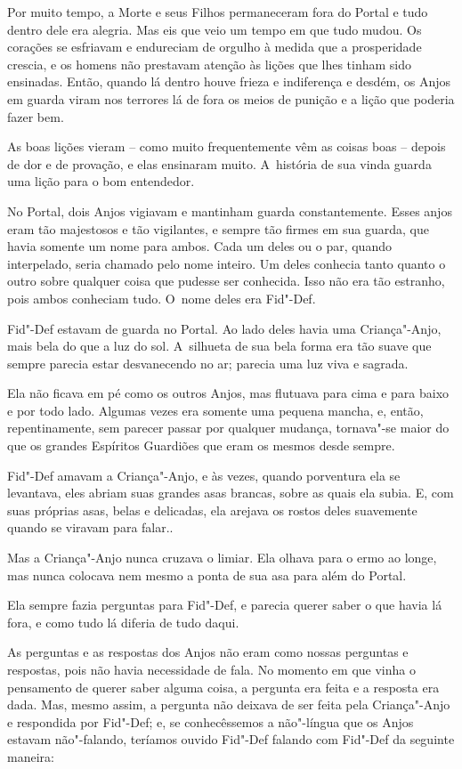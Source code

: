 Por muito tempo, a Morte e seus Filhos permaneceram fora do Portal e
tudo dentro dele era alegria. Mas eis que veio um tempo em que tudo
mudou. Os corações se esfriavam e endureciam de orgulho à medida que a
prosperidade crescia, e os homens não prestavam atenção às lições que
lhes tinham sido ensinadas. Então, quando lá dentro houve frieza e
indiferença e desdém, os Anjos em guarda viram nos terrores lá de fora
os meios de punição e a lição que poderia fazer bem.

As boas lições vieram -- como muito frequentemente vêm as coisas boas --
depois de dor e de provação, e elas ensinaram muito. A~história de sua
vinda guarda uma lição para o bom entendedor.

No Portal, dois Anjos vigiavam e mantinham guarda constantemente. Esses
anjos eram tão majestosos e tão vigilantes, e sempre tão firmes em sua
guarda, que havia somente um nome para ambos. Cada um deles ou o par,
quando interpelado, seria chamado pelo nome inteiro. Um deles conhecia
tanto quanto o outro sobre qualquer coisa que pudesse ser conhecida.
Isso não era tão estranho, pois ambos conheciam tudo. O~nome deles era
Fid"-Def.

Fid"-Def estavam de guarda no Portal. Ao lado deles havia uma
Criança"-Anjo, mais bela do que a luz do sol. A~silhueta de sua bela
forma era tão suave que sempre parecia estar desvanecendo no ar; parecia
uma luz viva e sagrada.

Ela não ficava em pé como os outros Anjos, mas flutuava para cima e para
baixo e por todo lado. Algumas vezes era somente uma pequena mancha, e,
então, repentinamente, sem parecer passar por qualquer mudança,
tornava"-se maior do que os grandes Espíritos Guardiões que eram os
mesmos desde sempre.

Fid"-Def amavam a Criança"-Anjo, e às vezes, quando porventura ela se
levantava, eles abriam suas grandes asas brancas, sobre as quais ela
subia. E, com suas próprias asas, belas e delicadas, ela arejava os
rostos deles suavemente quando se viravam para falar..

Mas a Criança"-Anjo nunca cruzava o limiar. Ela olhava para o ermo ao
longe, mas nunca colocava nem mesmo a ponta de sua asa para além do
Portal.

Ela sempre fazia perguntas para Fid"-Def, e parecia querer saber o que
havia lá fora, e como tudo lá diferia de tudo daqui.

As perguntas e as respostas dos Anjos não eram como nossas perguntas e
respostas, pois não havia necessidade de fala. No momento em que vinha o
pensamento de querer saber alguma coisa, a pergunta era feita e a
resposta era dada. Mas, mesmo assim, a pergunta não deixava de ser feita
pela Criança"-Anjo e respondida por Fid"-Def; e, se conhecêssemos a
não"-língua que os Anjos estavam não"-falando, teríamos ouvido Fid"-Def
falando com Fid"-Def da seguinte maneira:

